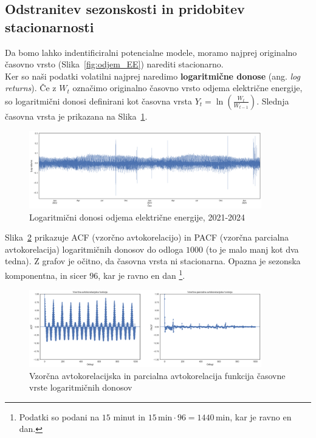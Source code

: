 \documentclass[a4paper, 11pt]{article}
\begin{document}
\subsection{Odstranitev sezonskosti in pridobitev stacionarnosti}

Da bomo lahko indentificiralni potencialne modele, moramo najprej originalno časovno vrsto (Slika~\ref{fig:odjem_EE})
narediti stacionarno. \\

\noindent Ker so naši podatki volatilni najprej naredimo \textbf{logaritmične donose} 
(ang. \emph{log returns}). Če z $W_t$ označimo originalno časovno vrsto odjema električne energije, so logaritmični donosi
definirani kot časovna vrsta $ Y_t = \ln \left( \frac{W_t}{W_{t-1}} \right) $. Slednja časovna vrsta je prikazana na
Slika~\ref{fig:log_returns}.

\begin{figure}[h!]
    \centering
    \caption{Logaritmični donosi odjema električne energije, 2021-2024}\par\medskip
    \label{fig:log_returns}
    \includegraphics[width=0.9\textwidth]{log_returns.png}
\end{figure}

\noindent Slika~\ref{fig:log_returns_acf_pacf} prikazuje 
ACF (vzorčno avtokorelacijo) in PACF (vzorčna parcialna avtokorelacija) logaritmičnih donosov do odloga $1000$ (to je
malo manj kot dva tedna). Z grafov je očitno, da časovna vrsta ni stacionarna. Opazna je sezonska komponentna, in sicer $96$, 
kar je ravno en dan \footnote{Podatki so podani na $15$ minut in $15\,\text{min} \cdot 96 = 1440\,\text{min}$, kar je ravno en dan.}.

\begin{figure}[h!]
    \centering
    \caption{Vzorčna avtokorelacijska in parcialna avtokorelacija funkcija časovne vrste logaritmičnih donosov}\par\medskip
    \label{fig:log_returns_acf_pacf}
    \includegraphics[width=0.9\textwidth]{log_returns_acf_pacf.png}
\end{figure}
\end{document}
